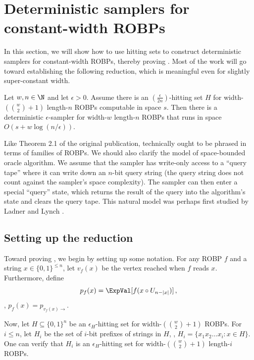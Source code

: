 \setcounter{section}{2}
\section{Deterministic samplers for constant-width ROBPs} \label{sec:constwidth}

In this section, we will show how to use hitting sets to construct deterministic samplers for constant-width ROBPs, thereby proving . Most of the work will go toward establishing the following reduction, which is meaningful even for slightly super-constant width.

\begin{theorem} \label{thm:const-width-reduction}
Let $w, n \in \N$ and let $\epsilon > 0$. Assume there is an $(\frac{\epsilon}{2n})$-hitting set $H$ for width-$(\binom{w}{2} + 1)$ length-$n$ ROBPs computable in space $s$. Then there is a deterministic $\epsilon$-sampler for width-$w$ length-$n$ ROBPs that runs in space $O(s + w \log(n/\epsilon))$.
\end{theorem}

Like Theorem 2.1 of the original publication,  technically ought to be phrased in terms of families of ROBPs. We should also clarify the model of space-bounded oracle algorithm. We assume that the sampler has write-only access to a ``query tape'' where it can write down an $n$-bit query string (the query string does not count against the sampler's space complexity). The sampler can then enter a special ``query'' state, which returns the result of the query into the algorithm's state and clears the query tape. This natural model was perhaps first studied by Ladner and Lynch \cite{LL76}.

\subsection{Setting up the reduction}
Toward proving , we begin by setting up some notation. For any ROBP $f$ and a string $x \in \{0, 1\}^{\leq n}$, let $v_f(x)$ be the vertex reached when $f$ reads $x$. Furthermore, define
$$
p_f(x) = \ExpVal[f(x \circ U_{n - |x|})]\,,
$$
\ie, $p_f(x) = p_{v_f(x) \to}$.

Now, let $H \subseteq \{0, 1\}^n$ be an $\epsilon_H$-hitting set for width-$(\binom{w}{2} + 1)$ ROBPs. For $i \leq n$, let $H_i$ be the set of $i$-bit prefixes of strings in $H$, \ie, $H_i = \{x_1 x_2 \dots x_i : x \in H\}$. One can verify that $H_i$ is an $\epsilon_H$-hitting set for width-$(\binom{w}{2} + 1)$ length-$i$ ROBPs.

